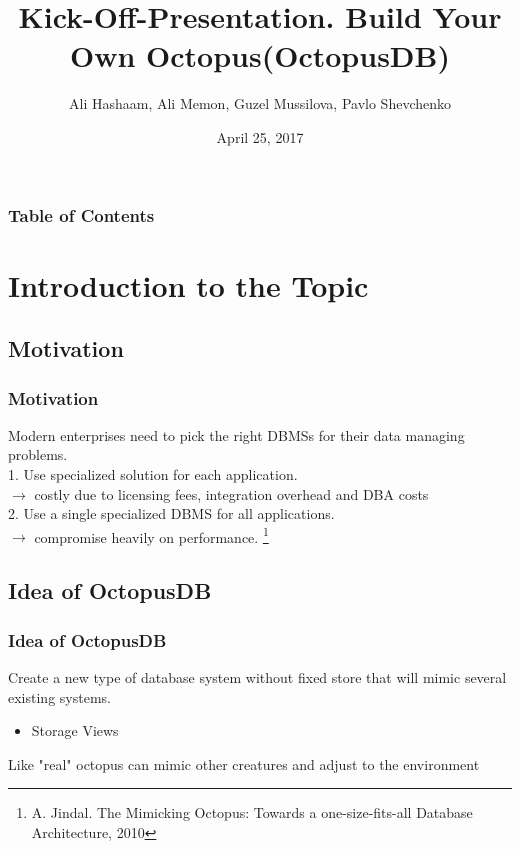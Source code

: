 \documentclass{beamer}
\title{Kick-Off-Presentation. Build Your Own Octopus(OctopusDB)}
\author{Ali Hashaam, Ali Memon, Guzel Mussilova, Pavlo Shevchenko}
\date{April 25, 2017}
\institute{Scientific Project: Databases for Multi-Dimensional Data, Genomics and Modern Hardware}
\begin{document}
\begin{frame}[plain]
 \titlepage
\end{frame}

\begin{frame}
\frametitle{Table of Contents}
\tableofcontents
\end{frame}

\section{Introduction to the Topic}

\subsection{Motivation}
\begin{frame}
\frametitle{Motivation}
Modern enterprises need to pick the right DBMSs for their data managing problems.\\ \pause
\hspace{0.2 cm} 1. Use specialized solution for each application. \\ \pause
\hspace{0.5 cm} $\rightarrow$ costly due to licensing fees, integration overhead and DBA costs\\ \pause
\hspace{0.2 cm} 2. Use a single specialized DBMS for all applications. \\ \pause
\hspace{0.5 cm} $\rightarrow$ compromise heavily on performance.
\footnote{A. Jindal. The Mimicking Octopus: Towards a one-size-fits-all Database Architecture, 2010}
\end{frame}

\subsection{Idea of OctopusDB}
\begin{frame}
\frametitle{Idea of OctopusDB}
Create a new type of database system without fixed store that will mimic several existing systems. \\ \pause
\begin{itemize}
\item{Storage Views}
\end{itemize}
Like "real" octopus can mimic other creatures and adjust to the environment
\end{frame}
\end{document}
